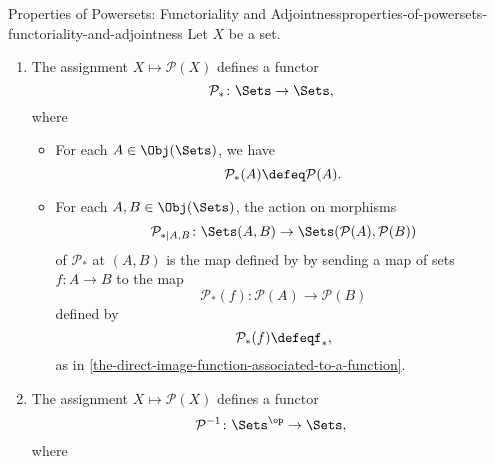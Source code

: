 \begin{proposition}{Properties of Powersets: Functoriality and Adjointness}{properties-of-powersets-functoriality-and-adjointness}%
    Let $X$ be a set.
    \begin{enumerate}
        \item\label{properties-of-powersets-functoriality-and-adjointness-functoriality-1}The assignment $X\mapsto\mathcal{P}(X)$ defines a functor
            \[
                \mathcal{P}_{*}%
                \colon%
                \Sets%
                \to%
                \Sets,%
            \]%
            where
            \begin{itemize}
                \item{}For each $A\in\Obj(\Sets)$, we have
                    \[
                        \mathcal{P}_{*}(A)%
                        \defeq%
                        \mathcal{P}(A).%
                    \]%
                \item{}For each $A,B\in\Obj(\Sets)$, the action on morphisms
                    \[
                        \mathcal{P}_{*|A,B}%
                        \colon%
                        \Sets(A,B)%
                        \to%
                        \Sets(\mathcal{P}(A),\mathcal{P}(B))%
                    \]%
                    of $\mathcal{P}_{*}$ at $(A,B)$ is the map defined by by sending a map of sets $f\colon A\to B$ to the map
                    \[
                        \mathcal{P}_{*}(f)%
                        \colon%
                        \mathcal{P}(A)%
                        \to%
                        \mathcal{P}(B)%
                    \]%
                    defined by
                    \[
                        \mathcal{P}_{*}(f)%
                        \defeq%
                        f_{*},%
                    \]%
                    as in \cref{the-direct-image-function-associated-to-a-function}.
            \end{itemize}
        \item\label{properties-of-powersets-functoriality-and-adjointness-functoriality-2}The assignment $X\mapsto\mathcal{P}(X)$ defines a functor
            \[
                \mathcal{P}^{-1}%
                \colon%
                \Sets^{\op}%
                \to%
                \Sets,%
            \]%
            where
            \begin{itemize}

\end{itemize}
\end{enumerate}
\end{proposition}
